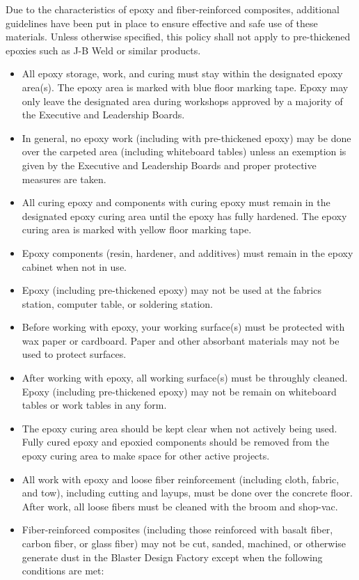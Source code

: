 \documentclass[12pt,letterpaper]{article}
\begin{document}
Due to the characteristics of epoxy and fiber-reinforced composites, additional guidelines have been put in place to ensure effective and safe use of these materials. Unless otherwise specified, this policy shall not apply to pre-thickened epoxies such as J-B Weld or similar products.
\begin{itemize}
    \item All epoxy storage, work, and curing must stay within the designated epoxy area(s). The epoxy area is marked with blue floor marking tape. Epoxy may only leave the designated area during workshops approved by a majority of the Executive and Leadership Boards.
    \item In general, no epoxy work (including with pre-thickened epoxy) may be done over the carpeted area (including whiteboard tables) unless an exemption is given by the Executive and Leadership Boards and proper protective measures are taken.
    \item All curing epoxy and components with curing epoxy must remain in the designated epoxy curing area until the epoxy has fully hardened. The epoxy curing area is marked with yellow floor marking tape.
    \item Epoxy components (resin, hardener, and additives) must remain in the epoxy cabinet when not in use.
    \item Epoxy (including pre-thickened epoxy) may not be used at the fabrics station, computer table, or soldering station.
    \item Before working with epoxy, your working surface(s) must be protected with wax paper or cardboard. Paper and other absorbant materials may not be used to protect surfaces.
    \item After working with epoxy, all working surface(s) must be throughly cleaned. Epoxy (including pre-thickened epoxy) may not be remain on whiteboard tables or work tables in any form.
    \item The epoxy curing area should be kept clear when not actively being used. Fully cured epoxy and epoxied components should be removed from the epoxy curing area to make space for other active projects. 
    \item All work with epoxy and loose fiber reinforcement (including cloth, fabric, and tow), including cutting and layups, must be done over the concrete floor. After work, all loose fibers must be cleaned with the broom and shop-vac. 
    \item Fiber-reinforced composites (including those reinforced with basalt fiber, carbon fiber, or glass fiber) may not be cut, sanded, machined, or otherwise generate dust in the Blaster Design Factory except when the following conditions are met:

\end{itemize}
\end{document}
